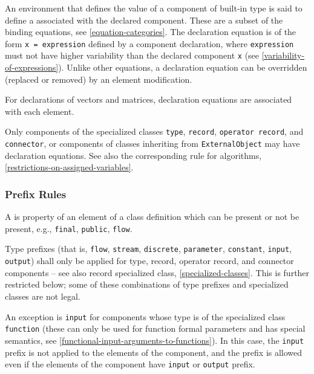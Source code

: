 An environment that defines the value of a component of built-in type is said to define a  associated with the declared component.
These are a subset of the binding equations, see \cref{equation-categories}.
The declaration equation is of the form \lstinline!x = expression! defined by a component declaration, where \lstinline!expression! must not have higher variability than the declared component \lstinline!x! (see \cref{variability-of-expressions}).
Unlike other equations, a declaration equation can be overridden (replaced or removed) by an element modification.

For declarations of vectors and matrices, declaration equations are associated with each element.

Only components of the specialized classes \lstinline!type!, \lstinline!record!, \lstinline!operator record!, and \lstinline!connector!, or components of classes inheriting from \lstinline!ExternalObject! may have declaration equations.
See also the corresponding rule for algorithms, \cref{restrictions-on-assigned-variables}.

\subsubsection{Prefix Rules}\label{prefix-rules}

A  is property of an element of a class definition which can be present or not be present, e.g., \lstinline!final!, \lstinline!public!, \lstinline!flow!.

Type prefixes (that is, \lstinline!flow!, \lstinline!stream!, \lstinline!discrete!, \lstinline!parameter!, \lstinline!constant!, \lstinline!input!, \lstinline!output!) shall only be applied for type, record, operator record, and connector components -- see also record specialized class, \cref{specialized-classes}.
This is further restricted below; some of these combinations of type prefixes and specialized classes are not legal.

An exception is \lstinline!input! for components whose type is of the specialized class \lstinline!function! (these can only be used for function formal parameters and has special semantics, see \cref{functional-input-arguments-to-functions}).
In this case, the \lstinline!input! prefix is not applied to the elements of the component, and the prefix is allowed even if the elements of the component have \lstinline!input! or \lstinline!output! prefix.

